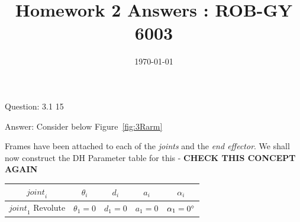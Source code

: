 \documentclass[a4paper]{article}
\title{Homework 2 Answers : ROB-GY 6003}
\author{\myName}
\date{\today}
\newcommand{\myName}{\textbf{Shantanu Ghodgaonkar}\\\textit{Univ ID}: N11344563\\\textit{Net ID}: sng8399\\\textit{Ph.No.}: +1 (929) 922-0614}
\begin{document}
	
	
	\begin{qalist}			
		\item[Question: 3.1] \setcounter{equation}{0} 15
		\item[Answer:] Consider below Figure~\ref{fig:3Rarm} \\
			\begin{minipage}{\linewidth}
				\vspace{0.5cm}
				\centering
				\label{fig:3Rarm}
				\vspace{0.5cm}
			\end{minipage}
			Frames have been attached to each of the \textit{joints} and the \textit{end effector}. 
			We shall now construct the DH Parameter table for this - \textbf{CHECK THIS CONCEPT AGAIN} \\
			\begin{minipage}{\linewidth}
				\vspace{0.5cm}
				\centering
				\begin{tabular}{|c|c|c|c|c|}
					\hline
					${joint}_{i}$ & ${\theta}_{i}$ & ${d}_{i}$ & ${a}_{i}$ & ${\alpha}_{i}$\\
					\hline
					${joint}_{1}$ Revolute & ${\theta}_{1} = 0$ & ${d}_{1} = 0$ & ${a}_{1} = 0$ & ${\alpha}_{1} = 0 \degree$\\

\end{tabular}
\end{minipage}
\end{qalist}
\end{document}

